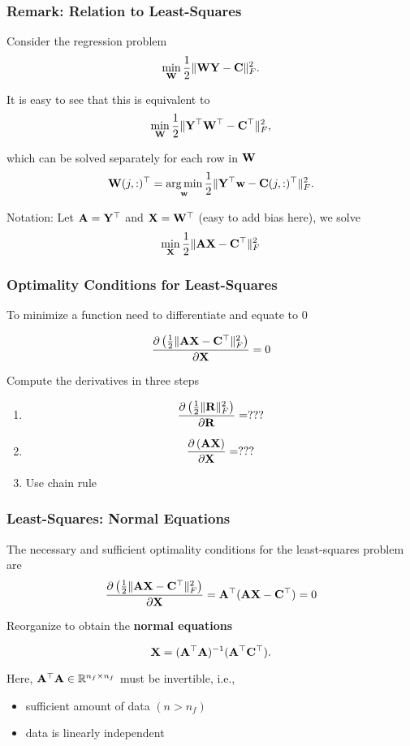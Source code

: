 \documentclass[12pt,fleqn,beamer]{beamer}
\begin{document}
\begin{frame}
	\frametitle{Remark: Relation to Least-Squares}
	
	Consider the regression problem
	$$ \min_{{\bf W}} {\frac 12} \|{\bf W} {\bf Y} - {\bf C}\|^2_F. $$
	
	It is easy to see that this is equivalent to
	$$ \min_{{\bf W}} {\frac 12} \| {\bf Y}^\top {\bf W}^\top - {\bf C}^\top\|^2_F, $$
	
	which can be solved separately for each row in ${\bf W}$
	$$
	{\bf W}(j,:)^\top = \operatorname*{arg\,min}_{{\bf w}} {\frac 12} \| {\bf Y}^\top {\bf w} - {\bf C}(j,:)^\top\|^2_F.
	$$
	
	Notation: Let ${\bf A} = {\bf Y}^\top$ and ${\bf X} = {\bf W}^\top$ (easy to add bias here), we solve
	$$
		\min_{\bf X} {\frac 12} \| {\bf A} {\bf X} - {\bf C}^\top \|^2_F
	$$
		
\end{frame} 

\begin{frame}\frametitle{Optimality Conditions for Least-Squares}

To minimize a function need to differentiate and equate to $0$

$$ {\frac {\partial \left( {\frac 12} \|{\bf A}{\bf X} - {\bf C}^\top\|^2_F \right)}{\partial {\bf X}}} = 0 $$

Compute the derivatives in three steps


\begin{enumerate}
\item $$ {\frac {\partial \left( {\frac 12} \|{\bf R} \|^2_F \right)}{\partial {\bf R}}} = ??? $$

\item $$ {\frac {\partial \left( {\bf A} {\bf X} \right)}{\partial {\bf X}}} = ??? $$

\item Use chain rule

\end{enumerate}


\end{frame} \begin{frame}\frametitle{Least-Squares: Normal Equations}

The necessary and sufficient optimality conditions for the least-squares problem are
$$ {\frac {\partial \left( {\frac 12} \|{\bf A}{\bf X} - {\bf C}^\top\|^2_F \right)}{\partial {\bf X}}} = 
{\bf A}^\top({\bf A} {\bf X} - {\bf C}^\top)=0 $$

Reorganize to obtain the {\bf normal equations}

$$ {\bf X} =  ({\bf A}^\top {\bf A})^{-1}({\bf A}^\top {\bf C}^\top). $$

Here, ${\bf A}^\top {\bf A} \in \mathbb{R}^{n_f \times n_f}$ must be invertible, i.e., 
\begin{itemize}
\item sufficient amount of data $(n>n_f)$
\item data is linearly independent
\end{itemize}

\end{frame}
\end{document}
